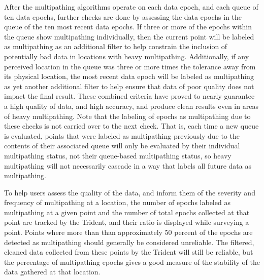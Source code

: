 \documentclass[12pt]{article}
\begin{document}
After the multipathing algorithms operate on each data epoch, and each queue of ten data epochs, further checks are done by assessing the data epochs in the queue of the ten most recent data epochs. If three or more of the epochs within the queue show multipathing individually, then the current point will be labeled as multipathing as an additional filter to help constrain the inclusion of potentially bad data in locations with heavy multipathing. Additionally, if any perceived location in the queue was three or more times the tolerance away from its physical location, the most recent data epoch will be labeled as multipathing as yet another additional filter to help ensure that data of poor quality does not impact the final result. These combined criteria have proved to nearly guarantee a high quality of data, and high accuracy, and produce clean results even in areas of heavy multipathing. Note that the labeling of epochs as multipathing due to these checks is not carried over to the next check. That is, each time a new queue is evaluated, points that were labeled as multipathing previously due to the contents of their associated queue will only be evaluated by their individual multipathing status, not their queue-based multipathing status, so heavy multipathing will not necessarily cascade in a way that labels all future data as multipathing.

To help users assess the quality of the data, and inform them of the severity and frequency of multipathing at a location, the number of epochs labeled as multipathing at a given point and the number of total epochs collected at that point are tracked by the Trident, and their ratio is displayed while surveying a point. Points where more than than approximately 50 percent of the epochs are detected as multipathing should generally be considered unreliable. The filtered, cleaned data collected from these points by the Trident will still be reliable, but the percentage of multipathing epochs gives a good measure of the stability of the data gathered at that location.
\end{document}
